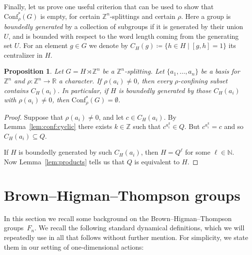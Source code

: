 \documentclass[10pt,a4paper]{article}
\newtheorem{prop}[cdrthm]{Proposition}
\theoremstyle{definition}
\theoremstyle{remark}
\newcommand{\N}{\mathbb{N}}
\newcommand{\Z}{\mathbb{Z}}
\newcommand{\R}{\mathbb{R}}
\newcommand{\Conf}{\mathrm{Conf}}
\theoremstyle{plain}
\begin{document}
Finally, let us prove one useful criterion that can be used to show that $\Conf^\ast_\rho(G)$ is empty, for certain $\Z^n$-splittings and certain $\rho$. Here a group is \emph{boundedly generated} by a collection of subgroups if it is generated by their union $U$, and is bounded with respect to the word length coming from the generating set $U$. For an element $g \in G$ we denote by $C_H(g) \coloneqq \{ h \in H \mid [g, h] = 1 \}$ its centralizer in $H$.

\begin{prop}
\label{prop:empty_conf}
Let $G = H \rtimes \Z^n$ be a $\Z^n$-splitting. Let $\{a_1,\dots,a_n\}$ be a basis for $\Z^n$ and $\rho\colon \Z^n \to \R$ a character. If $\rho(a_i) \neq 0$, then every $\rho$-confining subset contains $C_H(a_i)$. In particular, if $H$ is boundedly generated by those $C_H(a_i)$ with $\rho(a_i)\ne 0$, then $\Conf^\ast_\rho(G)= \emptyset$.
\end{prop}

\begin{proof}
Suppose that $\rho(a_i) \neq 0$, and let $c\in C_H(a_i)$. By Lemma~\ref{lem:conf:cyclic} there exists $k \in \Z$ such that $c^{a_i^k} \in Q$. But $c^{a_i^k} = c$ and so $C_H(a_i) \subseteq Q$.

If $H$ is boundedly generated by such $C_H(a_i)$, then $H=Q^\ell$ for some $\ell\in\N$. Now Lemma~\ref{lem:products} tells us that $Q$ is equivalent to $H$.
\end{proof}

\section{Brown--Higman--Thompson groups}\label{sec:thompson}

In this section we recall some background on the Brown--Higman--Thompson groups~$F_n$. We recall the following standard dynamical definitions, which we will repeatedly use in all that follows without further mention. For simplicity, we state them in our setting of one-dimensional actions:
\end{document}
